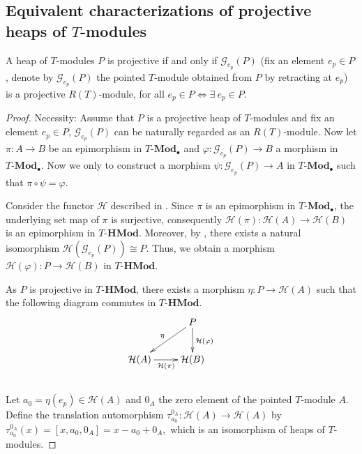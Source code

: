 \documentclass[11pt, twoside]{article}
\begin{document}
\subsection{Equivalent characterizations of projective heaps of $T$-modules}
\begin{theorem}\label{th1}\rm
A heap of $T$-modules $P$ is projective if and only if $\mathcal{G}_{e_p}(P)$ (fix an element $e_p\in P$, denote by $\mathcal{G}_{e_p}(P)$ the pointed $T$-module obtained from $P$ by retracting at $e_p$) is a projective $R(T)$-module, for all $e_p\in P \Leftrightarrow \exists~ e_p\in P$.
\end{theorem}
\begin{proof}
Necessity: Assume that $P$ is a projective heap of $T$-modules and fix an element $e_p\in P$, $\mathcal{G}_{e_p}(P)$ can be naturally regarded as an $R(T)$-module. Now let $\pi: A \to B$ be an epimorphism in $T\textbf{-Mod}_{\bullet}$ and $\varphi :\mathcal{G}_{e_p}(P) \to B$ a morphism in $T\textbf{-Mod}_{\bullet}$.
Now we only to construct a morphism $\psi :\mathcal{G}_{e_p}(P) \to A$ in $T\textbf{-Mod}_{\bullet}$ such that $\pi \circ \psi = \varphi$.

Consider the functor $\mathcal{H}$ described in \cite[Remark 2.16]{mb}. Since $\pi$ is an epimorphism in $T\textbf{-Mod}_{\bullet}$, the underlying set map of $\pi$ is surjective, consequently $\mathcal{H}(\pi) : \mathcal{H}(A) \to \mathcal{H}(B)$ is an epimorphism in $T\textbf{-HMod}$.
Moreover, by \cite[Remark 2.16]{mb}, there exists a natural isomorphism $\mathcal{H}(\mathcal{G}_{e_p}(P)) \cong P$. Thus, we obtain a morphism $\mathcal{H}(\varphi) : P \to \mathcal{H}(B)$ in $T\textbf{-HMod}$.

As $P$ is projective in $T\textbf{-HMod}$, there exists a morphism $\eta : P \to \mathcal{H}(A)$ such that the following diagram commutes in $T\textbf{-HMod}$.\\
$$ \xymatrix{ & P \ar[dl]_{\eta} \ar[d]^{\mathcal{H}(\varphi)} & \\
  \mathcal{H}(A) \ar[r]_{\mathcal{H}(\pi)} & \mathcal{H}(B) }$$ \\

Let $a_0 = \eta(e_p) \in \mathcal{H}(A)$ and $0_A$ the zero element of the pointed $T$-module $A$. Define the translation automorphism $\tau_{a_0}^{0_A} : \mathcal{H}(A) \to \mathcal{H}(A)$ by $\tau_{a_0}^{0_A}(x) = [x, a_0, 0_A] = x - a_0 + 0_A,$ which is an isomorphism of heaps of $T$-modules.


\end{proof}
\end{document}
